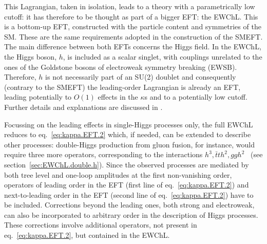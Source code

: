 This Lagrangian, taken in isolation, leads to a theory with a parametrically low cutoff: it has therefore to be thought as part of a bigger EFT: the EWChL\cite{Dobado:1989ax,Dobado:1989ue,Dobado:1990zh,Dobado:1990jy,Espriu:1991vm,Herrero:1993nc,Herrero:1994iu,Feruglio:1992wf,Bagger:1993zf,Koulovassilopoulos:1993pw,Burgess:1999ha,Wang:2006im,Grinstein:2007iv,Azatov:2012bz,Alonso:2012px,Buchalla:2012qq,Buchalla:2013rka,Buchalla:2013eza}. This is a bottom-up EFT, constructed with the particle content and symmetries of the SM. These are the same requirements adopted in the construction of the SMEFT. The main difference between both EFTs concerns the Higgs field. In the EWChL, the Higgs boson, $h$, is included as a scalar singlet, with couplings unrelated to the ones of the Goldstone bosons of electroweak symmetry breaking (EWSB). 
Therefore, $h$ is not necessarily part of an SU(2) doublet and consequently (contrary to the SMEFT) the leading-order Lagrangian is already an EFT, leading potentially to $O(1)$ effects in the $\kappa$s and to a potentially low cutoff.
Further details and explanations  are discussed in \cite{Guo:2015isa,Buchalla:2017jlu,Alonso:2017tdy,Buchalla:2013rka,Buchalla:2013eza,Buchalla:2015wfa,Buchalla:2016sop}.

Focussing on the leading effects in single-Higgs processes only, the full EWChL reduces to eq.~\eqref{eq:kappa.EFT.2} which, if needed,  can be extended to describe other processes:   double-Higgs production from gluon fusion, for instance, would require three more operators, corresponding to the interactions $h^{3},\bar{t}th^{2},ggh^{2}$~\cite{Grober:2015cwa,deFlorian:2016spz,Kim:2018uty,Buchalla:2018yce} (see section~\ref{sec:EWChL.double.h}). Since the observed processes are mediated by both tree level and one-loop amplitudes at the first non-vanishing order, operators of leading order in the EFT (first line of eq.~\eqref{eq:kappa.EFT.2}) and next-to-leading order in the EFT (second line of eq.~\eqref{eq:kappa.EFT.2}) have to be included\cite{Buchalla:2015wfa}. Corrections beyond the leading ones, both strong and electroweak, can also be incorporated to arbitrary order in the description of Higgs processes. These corrections involve additional operators, not present in eq.~\eqref{eq:kappa.EFT.2}, but contained in the EWChL.
 
